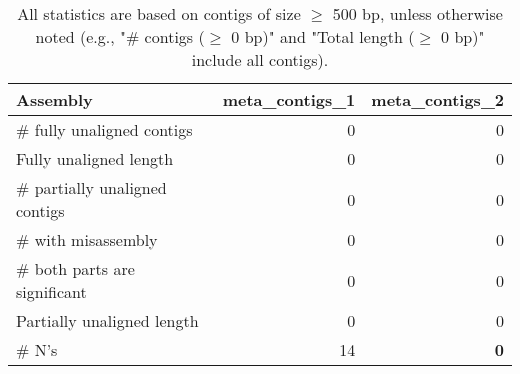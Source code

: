 \documentclass[12pt,a4paper]{article}
\begin{document}
\begin{table}[ht]
\begin{center}
\caption{All statistics are based on contigs of size $\geq$ 500 bp, unless otherwise noted (e.g., "\# contigs ($\geq$ 0 bp)" and "Total length ($\geq$ 0 bp)" include all contigs).}
\begin{tabular}{|l*{2}{|r}|}
\hline
Assembly & meta\_contigs\_1 & meta\_contigs\_2 \\ \hline
\# fully unaligned contigs & 0 & 0 \\ \hline
Fully unaligned length & 0 & 0 \\ \hline
\# partially unaligned contigs & 0 & 0 \\ \hline
\hspace{5mm}\# with misassembly & 0 & 0 \\ \hline
\hspace{5mm}\# both parts are significant & 0 & 0 \\ \hline
Partially unaligned length & 0 & 0 \\ \hline
\# N's & 14 & {\bf 0} \\ \hline
\end{tabular}
\end{center}
\end{table}
\end{document}
